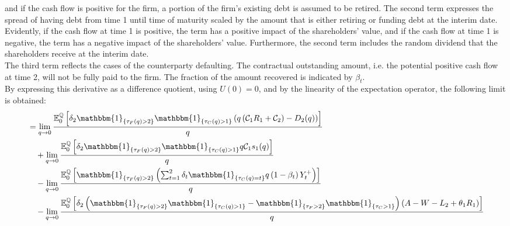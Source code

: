 \documentclass[main.tex]{subfiles}
\begin{document}
        and if the cash flow is positive for the firm, a portion of the firm's existing debt is assumed to be retired.
        The second term expresses the spread of having debt from time 1 until time of maturity scaled by the amount that is either retiring or funding debt at the interim date.
        Evidently, if the cash flow at time 1 is positive, the term has a positive impact of the shareholders' value,
        and if the cash flow at time 1 is negative, the term has a negative impact of the shareholders' value.
        Furthermore, the second term includes the random dividend that the shareholders receive at the interim date.
        \\
        The third term reflects the cases of the counterparty defaulting.
        The contractual outstanding amount, i.e. the potential positive cash flow at time 2, will not be fully paid to the firm.
        The fraction of the amount recovered is indicated by $\beta_{t}$.
        \\
        By expressing this derivative as a difference quotient, using $U(0)=0$,
        and by the linearity of the expectation operator,
        the following limit is obtained:
        \begin{align}
            &=
            \lim_{q \rightarrow 0}
            \frac{
                \mathbb{E}_{0}^{\rnmeasure}\left[
                    \delta_{2} \mathbbm{1}_{\{\tau_{F}(q)>2\}} \mathbbm{1}_{\{\tau_{C}(q)>1\}}
                    \left(
                        q\left(\mathcal{C}_{1} R_{1} + \mathcal{C}_{2}\right)
                        - D_{2}(q)
                    \right)
                \right]
            }{
                q
            }
            \nonumber
            \\
            &\quad+
            \lim_{q \rightarrow 0}
            \frac{
                \mathbb{E}_{0}^{\rnmeasure}\left[
                    \delta_2 \mathbbm{1}_{\{\tau_{F}(q)>2\}} \mathbbm{1}_{\{\tau_{C}(q)>1\}}
                    q\mathcal{C}_{1} s_1(q)
                \right]
            }{
                q
            }
            \nonumber
            \\
            &\quad-
            \lim_{q \rightarrow 0}
            \frac{
                \mathbb{E}_{0}^{\rnmeasure}\left[
                    \mathbbm{1}_{\{\tau_{F}(q)>2\}}
                    \left(
                        \sum_{t=1}^{2} \delta_{t} \mathbbm{1}_{\{\tau_{C}(q)=t\}}q\left(1-\beta_t\right)Y_{t}^{+}
                    \right)
                \right]
            }{
                q
            }
            \nonumber
            \\
            &\quad-
            \lim_{q \rightarrow 0}
            \frac{
                \mathbb{E}_{0}^{\rnmeasure}\left[
                    \delta_{2} \left(
                    \mathbbm{1}_{\{\tau_{F}(q)>2\}} \mathbbm{1}_{\{\tau_{C}(q)>1\}} - \mathbbm{1}_{\{\tau_{F}>2\}} \mathbbm{1}_{\{\tau_{C}>1\}}\right)
                    \left(
                        A - W
                        - L_{2}
                        + \theta_{1}R_{1}
                    \right)
                \right]
            }{
                q
            }
            \label{eqn:G-debt-multi-step-1}
        \end{align}
\end{document}
